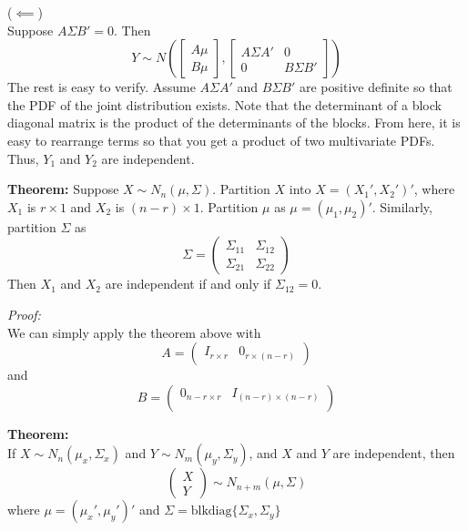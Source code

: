 \documentclass[12pt]{article}
\newcommand{\blkdiag}{\text{blkdiag}}
\numberwithin{equation}{section}
\begin{document}
($\impliedby$) \\
Suppose $A \Sigma B' = 0$. Then 
\begin{equation*}
  Y \sim N\left( 
    \begin{bmatrix} 
      A\mu \\
      B\mu
    \end{bmatrix},
    \begin{bmatrix}
      A \Sigma A' & 0 \\
      0 & B \Sigma B'
    \end{bmatrix}
  \right)
\end{equation*}
The rest is easy to verify. Assume $A \Sigma A'$ and $B \Sigma B'$ are positive definite so that the PDF of the joint distribution exists. Note that the determinant of a block diagonal matrix is the product of the determinants of the blocks. From here, it is easy to rearrange terms so that you get a product of two multivariate PDFs. Thus, $Y_1$ and $Y_2$ are independent.

\textbf{Theorem:} Suppose $X \sim N_n(\mu, \Sigma)$. Partition $X$ into $X = (X_1', X_2')'$, where $X_1$ is $r \times 1$ and $X_2$ is $(n - r) \times 1$. Partition $\mu$ as $\mu = (\mu_1, \mu_2)'$. Similarly, partition $\Sigma$ as
\begin{equation*}
  \Sigma =
  \begin{pmatrix}
    \Sigma_{11} & \Sigma_{12} \\
    \Sigma_{21} & \Sigma_{22}
  \end{pmatrix}
\end{equation*}
Then $X_1$ and $X_2$ are independent if and only if $\Sigma_{12} = 0$. 

\textit{Proof:} \\
We can simply apply the theorem above with 
\begin{equation*}
  A = 
  \begin{pmatrix}
    I_{r \times r} & 0_{r \times (n - r)}
  \end{pmatrix}
\end{equation*}
and
\begin{equation*}
  B = 
  \begin{pmatrix}
    0_{n - r \times r} & I_{(n - r) \times (n - r)} \\
  \end{pmatrix}
\end{equation*}

\textbf{Theorem:} \\
If $X \sim N_n(\mu_x, \Sigma_x)$ and $Y \sim N_m(\mu_y, \Sigma_y)$, and $X$ and $Y$ are independent, then
\begin{equation*}
  \begin{pmatrix}
    X \\ Y
  \end{pmatrix}
  \sim N_{n + m}(\mu, \Sigma)
\end{equation*}
where $\mu = (\mu_x', \mu_y')'$ and $\Sigma = \blkdiag\{ \Sigma_x, \Sigma_y \}$
\end{document}
